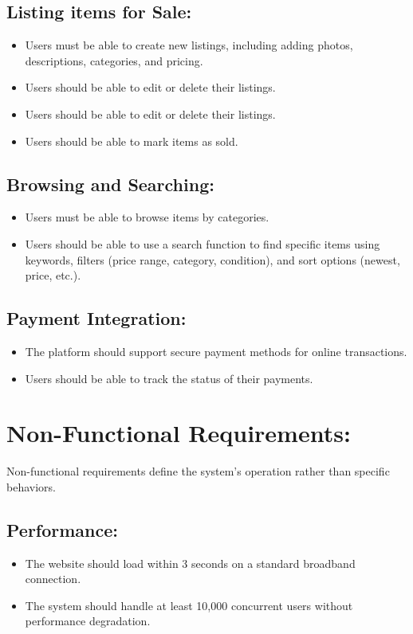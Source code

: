\subsection{Listing items for Sale:}
\begin{itemize}
        \item Users must be able to create new listings, including adding photos, descriptions, categories, and pricing.
    
        \item Users should be able to edit or delete their listings.
        \item Users should be able to edit or delete their listings.
        \item Users should be able to mark items as sold.
\end{itemize}

\subsection{Browsing and Searching:}
\begin{itemize}
        \item Users must be able to browse items by categories.
        \item Users should be able to use a search function to find specific items using keywords, filters (price range, category, condition), and sort options (newest, price, etc.).
\end{itemize}

\subsection{Payment Integration:}
\begin{itemize}
        \item The platform should support secure payment methods for online transactions.
        \item Users should be able to track the status of their payments.
\end{itemize}

\section{Non-Functional Requirements:}
Non-functional requirements define the system’s operation rather than specific behaviors.
\subsection{Performance:}
\begin{itemize}
        \item The website should load within 3 seconds on a standard broadband connection.
        \item The system should handle at least 10,000 concurrent users without performance degradation.
\end{itemize}

